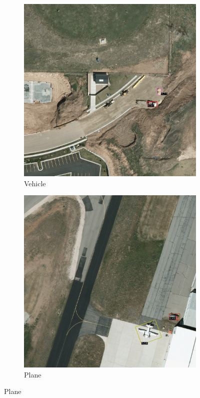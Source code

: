 \begin{figure}[h!]
    \begin{subfigure}[t]{0.38\textwidth}
        \centering
        \includegraphics[width=\linewidth]{images/015Results/01abb_vs_obb/comp_images/aab_old/427.png}
        \caption{Vehicle}
    \end{subfigure}
    \begin{subfigure}[t]{0.38\textwidth}
        \centering
        \includegraphics[width=\linewidth]{images/015Results/01abb_vs_obb/comp_images/aab_old/487.png}
        \caption{Plane}
    \end{subfigure}
    

\end{figure}
